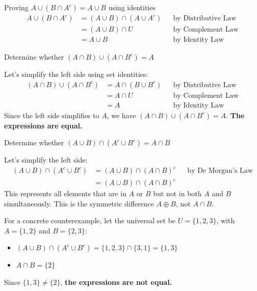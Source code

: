 \begin{example}{Proving $A \cup (B \cap A^c) = A \cup B$ using identities}
\begin{align*}
    A \cup (B \cap A^c) &= (A \cup B) \cap (A \cup A^c) && \text{by Distributive Law} \\
    &= (A \cup B) \cap U && \text{by Complement Law} \\
    &= A \cup B && \text{by Identity Law}
\end{align*}
\end{example}

\begin{example}{Determine whether $(A \cap B) \cup (A \cap B^c) = A$}
\begin{solution}
Let's simplify the left side using set identities:
\begin{align*}
    (A \cap B) \cup (A \cap B^c) &= A \cap (B \cup B^c) && \text{by Distributive Law} \\
    &= A \cap U && \text{by Complement Law} \\
    &= A && \text{by Identity Law}
\end{align*}
Since the left side simplifies to $A$, we have $(A \cap B) \cup (A \cap B^c) = A$. \textbf{The expressions are equal.}
\end{solution}
\end{example}

\begin{example}{Determine whether $(A \cup B) \cap (A^c \cup B^c) = A \cap B$}
\begin{solution}
Let's simplify the left side:
\begin{align*}
    (A \cup B) \cap (A^c \cup B^c) &= (A \cup B) \cap (A \cap B)^c && \text{by De Morgan's Law} \\
    &= (A \cup B) \cap (A \cap B)^c
\end{align*}
This represents all elements that are in $A$ or $B$ but not in both $A$ and $B$ simultaneously. This is the symmetric difference $A \oplus B$, not $A \cap B$.

For a concrete counterexample, let the universal set be $U=\{1,2,3\}$, with $A = \{1, 2\}$ and $B = \{2, 3\}$:
\begin{itemize}
    \item $(A \cup B) \cap (A^c \cup B^c) = \{1, 2, 3\} \cap \{3, 1\} = \{1, 3\}$
    \item $A \cap B = \{2\}$
\end{itemize}
Since $\{1, 3\} \neq \{2\}$, \textbf{the expressions are not equal.}
\end{solution}
\end{example}

